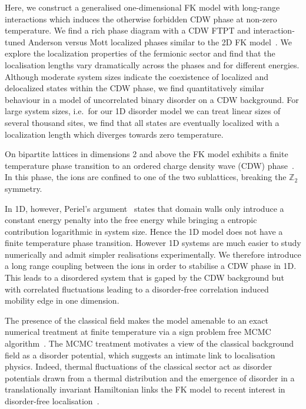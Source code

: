 Here, we construct a generalised one-dimensional FK model with long-range interactions which induces the otherwise forbidden CDW phase at non-zero temperature. We find a rich phase diagram with a CDW FTPT and interaction-tuned Anderson versus Mott localized phases similar to the 2D FK model~\autocite{antipovInteractionTunedAndersonMott2016}. We explore the localization properties of the fermionic sector and find that the localisation lengths vary dramatically across the phases and for different energies. Although moderate system sizes indicate the coexistence of localized and delocalized states within the CDW phase, we find quantitatively similar behaviour in a model of uncorrelated binary disorder on a CDW background. For large system sizes, i.e.~for our 1D disorder model we can treat linear sizes of several thousand sites, we find that all states are eventually localized with a localization length which diverges towards zero temperature.

On bipartite lattices in dimensions 2 and above the FK model exhibits a finite temperature phase transition to an ordered charge density wave (CDW) phase~\autocite{maskaThermodynamicsTwodimensionalFalicovKimball2006}. In this phase, the ions are confined to one of the two sublattices, breaking the \(\mathbb{Z}_2\) symmetry.

In 1D, however, Periel's argument~\autocite{peierlsIsingModelFerromagnetism1936,kennedyItinerantElectronModel1986} states that domain walls only introduce a constant energy penalty into the free energy while bringing a entropic contribution logarithmic in system size. Hence the 1D model does not have a finite temperature phase transition. However 1D systems are much easier to study numerically and admit simpler realisations experimentally. We therefore introduce a long range coupling between the ions in order to stabilise a CDW phase in 1D. This leads to a disordered system that is gaped by the CDW background but with correlated fluctuations leading to a disorder-free correlation induced mobility edge in one dimension.

The presence of the classical field makes the model amenable to an exact numerical treatment at finite temperature via a sign problem free MCMC algorithm~\autocite{devriesGapsDensitiesStates1993,devriesSimplifiedHubbardModel1993,antipovInteractionTunedAndersonMott2016,debskiPossibilityDetectionFinite2016,herrmannSpreadingCorrelationsFalicovKimball2018,maskaThermodynamicsTwodimensionalFalicovKimball2006}. The MCMC treatment motivates a view of the classical background field as a disorder potential, which suggests an intimate link to localisation physics. Indeed, thermal fluctuations of the classical sector act as disorder potentials drawn from a thermal distribution and the emergence of disorder in a translationally invariant Hamiltonian links the FK model to recent interest in disorder-free localisation~\autocite{smithDisorderFreeLocalization2017,smithDynamicalLocalizationMathbbZ2018,brenesManyBodyLocalizationDynamics2018}.

